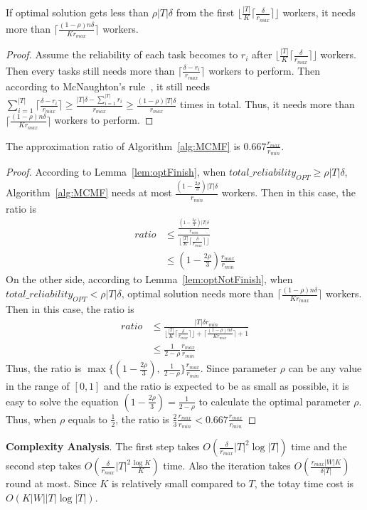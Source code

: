 \begin{lemma}
\label{lem:optNotFinish}
If optimal solution gets less than $\rho |T|\delta$ 
from the first $\lfloor \frac{|T|}{K}\lceil \frac{\delta}{r_{max}} \rceil \rfloor$ workers,
it needs more than $\lceil \frac{(1-\rho) n\delta}{Kr_{max}} \rceil$ workers.
\end{lemma}
\begin{proof}
Assume the reliability of each task becomes to $r_i$ after $\lfloor \frac{|T|}{K}\lceil \frac{\delta}{r_{max}} \rceil \rfloor$ workers.
Then every tasks still needs more than $\lceil \frac{\delta-r_i}{r_{max}} \rceil$ workers to perform.
Then according to McNaughton's rule~\cite{NaughtonRule}, it still needs 
$\sum_{i=1}^{|T|} {\lceil \frac{\delta-r_i}{r_{max}} \rceil} \ge \frac{|T|\delta-\sum_{i=1}^{|T|}{r_i}}{r_{max}} \ge \frac{(1-\rho)|T|\delta}{r_{max}}$ times in total. 
Thus, it needs more than $\lceil \frac{(1-\rho) n\delta}{Kr_{max}} \rceil$ workers to perform.
\end{proof}

\begin{theorem}
The approximation ratio of Algorithm~\ref{alg:MCMF} is $0.667\frac{r_{max}}{r_{min}}$.
\end{theorem}
\begin{proof}
According to Lemma~\ref{lem:optFinish}, when $total\_reliability_{OPT} \ge \rho |T|\delta$, 
Algorithm~\ref{alg:MCMF} needs at most $\frac{(1-\frac{2\rho}{3}) |T|\delta}{r_{min}}$ workers.
Then in this case, the ratio is 
\begin{align*}
ratio &\le \frac{\frac{(1-\frac{2\rho}{3}) |T|\delta}{r_{min}}}{\lfloor \frac{|T|}{K}\lceil \frac{\delta}{r_{max}} \rceil \rfloor} \\
	  &\le (1-\frac{2\rho}{3})\frac{r_{max}}{r_{min}}
\end{align*}
On the other side, according to Lemma~\ref{lem:optNotFinish}, when $total\_reliability_{OPT} < \rho |T|\delta$,
optimal solution needs more than $\lceil \frac{(1-\rho) n\delta}{Kr_{max}} \rceil$ workers.
Then in this case, the ratio is
\begin{align*}
ratio &\le \frac{{|T|\delta}{r_{min}}}{\lfloor \frac{|T|}{K}\lceil \frac{\delta}{r_{max}} \rceil \rfloor + \lceil \frac{(1-\rho) n\delta}{Kr_{max}} \rceil + 1} \\
	  &\le \frac{1}{2-\rho}\frac{r_{max}}{r_{min}}
\end{align*} 
Thus, the ratio is $\max\{(1-\frac{2\rho}{3}),\ \frac{1}{2-\rho}\}\frac{r_{max}}{r_{min}}$.
Since parameter $\rho$ can be any value in the range of $[0,1]$ and the ratio is expected to be as small as possible, 
it is easy to solve the equation $(1-\frac{2\rho}{3}) = \frac{1}{2-\rho}$ to calculate the optimal parameter $\rho$.
Thus, when $\rho$ equals to $\frac{1}{2}$, the ratio is $\frac{2}{3} \frac{r_{max}}{r_{min}} < 0.667 \frac{r_{max}}{r_{min}}$
\end{proof}

\textbf{Complexity Analysis}. 
The first step takes $O(\frac{\delta}{r_{max}} |T|^2\log{|T|})$ time and
the second step takes $O(\frac{\delta}{r_{max}} |T|^2\frac{\log{K}}{K})$ time.
Also the iteration takes $O(\frac{r_{max}|W|K}{\delta|T|})$ round at most.
Since $K$ is relatively small compared to $T$, the totay time cost is
$O(K|W||T|\log{|T|})$.